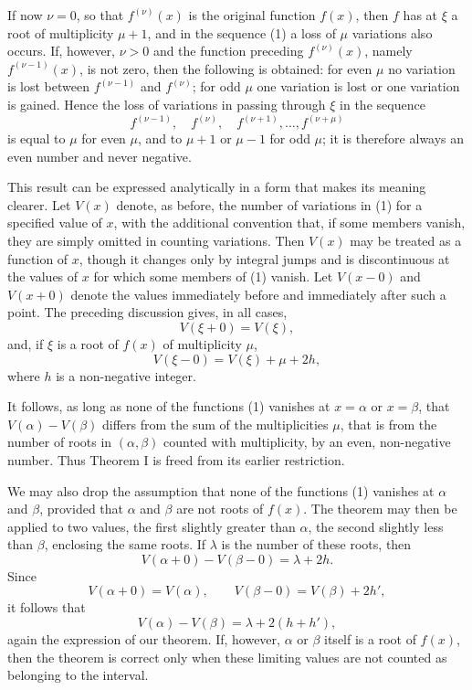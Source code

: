 \documentclass[11pt]{article}
\begin{document}
If now $\nu=0$, so that $f^{(\nu)}(x)$ is the original function $f(x)$, then $f$ has at $\xi$ a root of multiplicity $\mu+1$, and in the sequence (1) a loss of $\mu$ variations also occurs. If, however, $\nu>0$ and the function preceding $f^{(\nu)}(x)$, namely $f^{(\nu-1)}(x)$, is not zero, then the following is obtained: for even $\mu$ no variation is lost between $f^{(\nu-1)}$ and $f^{(\nu)}$; for odd $\mu$ one variation is lost or one variation is gained. Hence the loss of variations in passing through $\xi$ in the sequence
\begin{equation}
        f^{(\nu-1)},\quad f^{(\nu)},\quad f^{(\nu+1)},\ldots,
        f^{(\nu+\mu)}
\tag{5}
\end{equation}
is equal to $\mu$ for even $\mu$, and to $\mu+1$ or $\mu-1$ for odd $\mu$; it is therefore always an even number and never negative.

This result can be expressed analytically in a form that makes its meaning clearer. Let $V(x)$ denote, as before, the number of variations in (1) for a specified value of $x$, with the additional convention that, if some members vanish, they are simply omitted in counting variations. Then $V(x)$ may be treated as a function of $x$, though it changes only by integral jumps and is discontinuous at the values of $x$ for which some members of (1) vanish. Let $V(x-0)$ and $V(x+0)$ denote the values immediately before and immediately after such a point. The preceding discussion gives, in all cases,
\begin{equation}
        V(\xi+0)=V(\xi),
\tag{6}
\end{equation}
and, if $\xi$ is a root of $f(x)$ of multiplicity $\mu$,
\begin{equation}
        V(\xi-0)=V(\xi)+\mu+2h,
\tag{7}
\end{equation}
where $h$ is a non-negative integer.

It follows, as long as none of the functions (1) vanishes at $x=\alpha$ or $x=\beta$, that $V(\alpha)-V(\beta)$ differs from the sum of the multiplicities $\mu$, that is from the number of roots in $(\alpha,\beta)$ counted with multiplicity, by an even, non-negative number. Thus Theorem I is freed from its earlier restriction.

We may also drop the assumption that none of the functions (1) vanishes at $\alpha$ and $\beta$, provided that $\alpha$ and $\beta$ are not roots of $f(x)$. The theorem may then be applied to two values, the first slightly greater than $\alpha$, the second slightly less than $\beta$, enclosing the same roots. If $\lambda$ is the number of these roots, then
\[
        V(\alpha+0)-V(\beta-0)=\lambda+2h.
\]
Since
\[
        V(\alpha+0)=V(\alpha),\qquad
        V(\beta-0)=V(\beta)+2h',
\]
it follows that
\[
        V(\alpha)-V(\beta)=\lambda+2(h+h'),
\]
again the expression of our theorem. If, however, $\alpha$ or $\beta$ itself is a root of $f(x)$, then the theorem is correct only when these limiting values are not counted as belonging to the interval.
\end{document}
